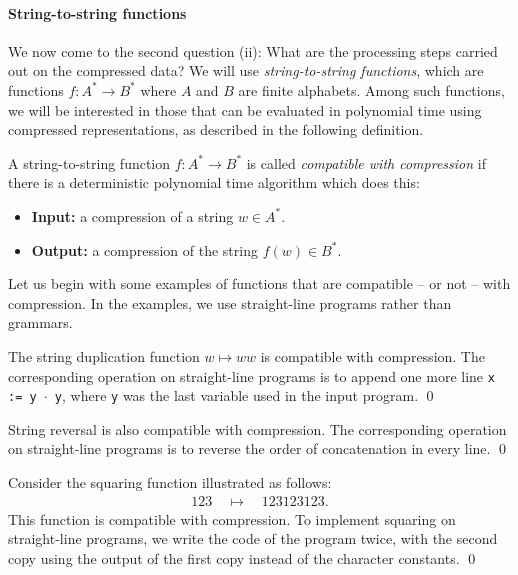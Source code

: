\documentclass[a4paper,UKenglish,cleveref, autoref, thm-restate]{lipics-v2021}
\begin{document}
\paragraph{String-to-string functions}
We now come to the second question (ii): What are the processing steps carried out on the compressed data? We will use 
 \emph{string-to-string functions}, which are  functions $f : A^* \to B^*$ where $A$ and $B$ are finite alphabets. Among such functions, we will be interested in those that  can be evaluated in polynomial time  using compressed representations,  as described in the following definition.

\begin{definition}
    A string-to-string function $f : A^* \to B^*$ is called \emph{compatible with compression} if there is a deterministic polynomial time algorithm which does this: 
    \begin{itemize}
        \item \textbf{Input:} a compression of a string $w \in A^*$.
        \item \textbf{Output:} a compression of the string $f(w) \in B^*$.
    \end{itemize}
\end{definition}
Let us begin with some examples of functions that are compatible -- or not --  with compression. In the examples, we use straight-line programs rather than grammars.

\begin{example}[duplication]\label{ex:duplication}
    The string duplication function $w \mapsto ww$ is compatible with compression. The corresponding operation on straight-line programs is to append one more line \texttt{x := y $\cdot$ y}, where \texttt{y} was the last variable used in the input program. \qed
\end{example}

\begin{example}[reversal]\label{ex:reversal}
    String reversal is also compatible with compression. The corresponding operation on straight-line programs is to reverse the order of concatenation in every line. \qed
\end{example}

\begin{example}[squaring]\label{ex:squaring}
  Consider the squaring function illustrated as follows:
\begin{align*}
    123 \quad \mapsto \quad 123123123.
\end{align*}
This function  is compatible with compression. To implement squaring on  straight-line programs, we write the code of the program twice, with the second copy using the output of the first copy instead of the character constants. \qed
\end{example}
\end{document}
